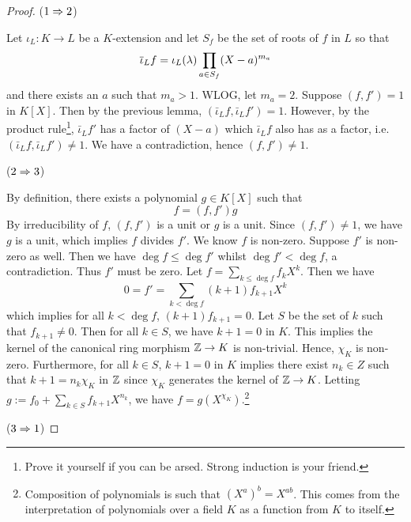 \documentclass[../book.tex]{subfiles}
\begin{document}
\begin{proof}
    ($1\Rightarrow 2$)
    
        Let $\iota_L : K \to L$ be a $K$-extension 
        and let $S_f$ be the set of roots of $f$ in $L$ so that \[
            \overline{\iota}_L f = \iota_L(\lambda) \prod_{a\in S_f} (X - a)^{m_a}
        \]
        and there exists an $a$ such that $m_a > 1$. 
        WLOG, let $m_a = 2$.
        Suppose $(f,f') = 1$ in $K[X]$. 
        Then by the previous lemma, $(\bar\iota_L f, \bar\iota_L f') = 1$. 
        However, by the product rule\footnote{
        Prove it yourself if you can be arsed.
        Strong induction is your friend.}, 
        $\bar\iota_L f'$ has a factor of $(X - a)$
        which $\bar\iota_L f$ also has as a factor, i.e.
        $(\bar\iota_L f, \bar\iota_L f') \neq 1$.
        We have a contradiction, hence $(f,f') \neq 1$. 
    
    ($2\Rightarrow 3$)
    
        By definition, there exists a polynomial $g \in K[X]$ such that 
        \[f = (f,f') g\]
        By irreducibility of $f$, $(f,f')$ is a unit or $g$ is a unit. 
        Since $(f,f') \neq 1$, we have $g$ is a unit, 
        which implies $f$ divides $f'$.
        We know $f$ is non-zero. 
        Suppose $f'$ is non-zero as well.
        Then we have $\deg f \leq \deg f'$ whilst $\deg f' < \deg f$,
        a contradiction. 
        Thus $f'$ must be zero. 
        Let $f = \sum_{k\leq\deg f} f_k X^k$. 
        Then we have \[
            0 = f' = \sum_{k < \deg f} (k+1) f_{k+1} X^k
        \]
        which implies for all $k < \deg f$, $(k+1) f_{k+1} = 0$.
        Let $S$ be the set of $k$ such that $f_{k+1} \ne 0$.
        Then for all $k \in S$, we have $k+1 = 0$ in $K$.
        This implies the kernel of the canonical ring morphism 
        $\mathbb{Z} \to K$ is non-trivial. 
        Hence, $\chi_K$ is non-zero. 
        Furthermore, for all $k \in S$,
        $k+1 = 0$ in $K$ implies there exist $n_k \in Z$ such that 
        $k+1 = n_k\chi_K$ in $\mathbb{Z}$
        since $\chi_K$ generates the kernel of $\mathbb{Z} \to K$. 
        Letting $g := f_0 + \sum_{k \in S} f_{k+1}X^{n_k}$,
        we have $f = g(X^{\chi_K})$.\footnote{
            Composition of polynomials is such that $(X^a)^b=X^{ab}$.
            This comes from the interpretation of polynomials over a field $K$
            as a function from $K$ to itself. 
        }
        
    ($3\Rightarrow 1$)
    

\end{proof}
\end{document}
